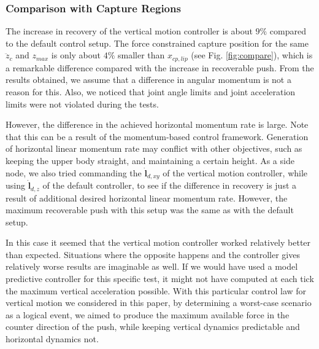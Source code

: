 \documentclass[letterpaper, 10 pt, conference]{ieeeconf}  %
\newcommand{\zmax}{z_{max}}
\begin{document}
\subsubsection{Comparison with Capture Regions}
The increase in recovery of the vertical motion controller is about $9\%$ compared to the default control setup. The force constrained capture position for the same $\ddot{z}_c$ and $\zmax$ is only about $4\%$ smaller than $x_{cp,lip}$ (see Fig. \ref{fig:compare}), which is a remarkable difference compared with the increase in recoverable push. From the results obtained, we assume that a difference in angular momentum is not a reason for this. Also, we noticed that joint angle limits and joint acceleration limits were not violated during the tests. 

However, the difference in the achieved horizontal momentum rate is large. Note that this can be a result of the momentum-based control framework. Generation of horizontal linear momentum rate may conflict with other objectives, such as keeping the upper body straight, and maintaining a certain height. As a side node, we also tried commanding the $\dot{\mathbf{l}}_{d,xy}$ of the vertical motion controller, while using $\dot{\mathbf{l}}_{d,z}$ of the default controller, to see if the difference in recovery is just a result of additional desired horizontal linear momentum rate. However, the maximum recoverable push with this setup was the same as with the default setup.

In this case it seemed that the vertical motion controller worked relatively better than expected. Situations where the opposite happens and the controller gives relatively worse results are imaginable as well. If we would have used a model predictive controller for this specific test, it might not have computed at each tick the maximum vertical acceleration possible. With this particular control law for vertical motion we considered in this paper, by determining a worst-case scenario as a logical event, we aimed to produce the maximum available force in the counter direction of the push, while keeping vertical dynamics predictable and horizontal dynamics not.

\end{document}
